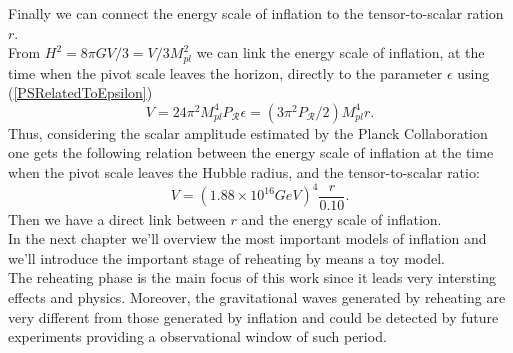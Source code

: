 \documentclass[11pt,a4paper,twoside]{book}
\begin{document}
Finally we can connect the energy scale of inflation to the tensor-to-scalar ration $ r $.\\
From $ H^{2}=8\pi GV/3 = V/3M_{pl}^{2}$ we can link the energy scale of inflation, at the time when the pivot scale leaves the horizon, directly to the parameter $\epsilon$ using (\ref{PSRelatedToEpsilon})
\begin{equation}
	V=24\pi^{2}M_{pl}^{4}P_{\mathcal{R}}\epsilon =(3\pi^{2}P_{\mathcal{R}}/2)M_{pl}^{4}r.
\end{equation}
Thus, considering  the scalar amplitude estimated  by the Planck Collaboration \cite{Plank2015:Chap1} one gets  the following relation between the energy scale of inflation at the time when the pivot scale leaves the Hubble radius, and the tensor-to-scalar ratio:
\begin{equation}
	\label{energyScaleInflation-r}
	V=(1.88\times10^{16}GeV)^{4}\frac{r}{0.10}.
\end{equation}
Then we have a direct link between $ r $ and the energy scale of inflation.\\

In the next chapter we'll overview the most important models of inflation and we'll introduce the important stage of reheating by means a toy model.\\
The reheating phase is the main focus of this work since it leads very intersting effects and physics. Moreover, the gravitational waves generated by reheating are very different from those generated by inflation and could be detected by future experiments providing a observational window of such period.
\end{document}
